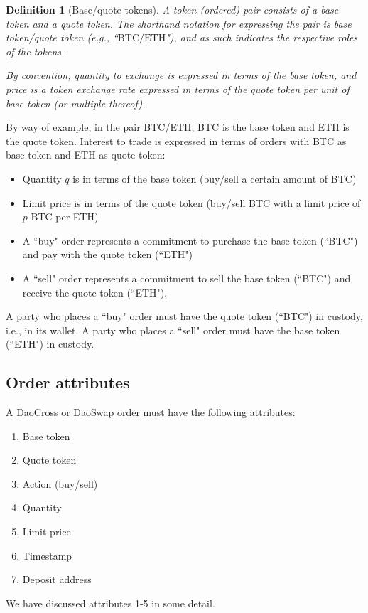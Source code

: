 \documentclass[11pt, reqno]{amsart}
\newtheorem{definition}[thm]{Definition}
\newcommand{\BTC}{\mathrm{BTC}}
\newcommand{\ETH}{\mathrm{ETH}}
\begin{document}
\begin{definition}[Base/quote tokens]
A token (ordered) pair consists of a \emph{base token} and a
\emph{quote token}. The shorthand notation for expressing the pair is
\emph{base token/quote token} (e.g., ``$\BTC/\ETH$"), and as such indicates the
respective roles of the tokens.

By convention, \emph{quantity} to exchange is expressed in terms of the base
token, and \emph{price} is a token exchange rate expressed in terms of the
quote token per unit of base token (or multiple thereof).
\end{definition}

By way of example, in the pair BTC/ETH, BTC is the base token and ETH is the
quote token. Interest to trade is expressed in terms of orders with BTC as
base token and ETH as quote token:
\begin{itemize}
    \item Quantity $q$ is in terms of the base token (buy/sell a certain
        amount of BTC)
    \item Limit price is in terms of the quote token (buy/sell BTC with a
        limit price of $p$ BTC per ETH)
    \item A ``buy" order represents a commitment to purchase the base token
        (``BTC") and pay with the quote token (``ETH")
    \item A ``sell" order represents a commitment to sell the base token
        (``BTC") and receive the quote token (``ETH").
\end{itemize}

A party who places a ``buy" order must have the quote token (``BTC") in custody,
i.e., in its wallet. A party who places a ``sell" order must have the base
token (``ETH") in custody.

\subsection{Order attributes}

A DaoCross or DaoSwap order must have the following attributes:
\begin{enumerate}
    \item Base token
    \item Quote token
    \item Action (buy/sell)
    \item Quantity
    \item Limit price
    \item Timestamp
    \item Deposit address
\end{enumerate}
We have discussed attributes 1-5 in some detail.
\end{document}
